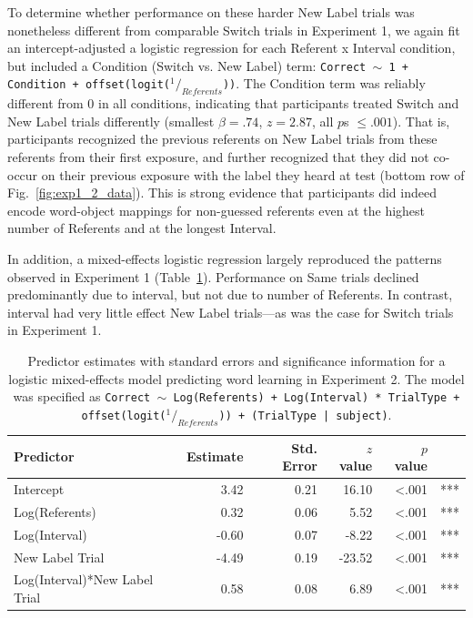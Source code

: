 \documentclass[man,floatsintext]{apa6}
\begin{document}
To determine whether performance on these harder New Label trials was nonetheless different from comparable Switch trials in Experiment 1, we again fit an intercept-adjusted a logistic regression for each Referent x Interval condition, but included a Condition (Switch vs. New Label) term: {\small \tt{Correct $\sim$ 1 + Condition + offset(logit($^1/_{Referents}$))}}. The Condition term was reliably different from 0 in all conditions, indicating that participants treated Switch and New Label trials differently (smallest $\beta =  .74$, $z=2.87$, all $p$s $\leq .001$). That is, participants recognized the previous referents on New Label trials from these referents from their first exposure, and further recognized that they did not co-occur on their previous exposure with the label they heard at test (bottom row of Fig.~\ref{fig:exp1_2_data}). This is strong evidence that participants did indeed encode word-object mappings for non-guessed referents even at the highest number of Referents and at the longest Interval.

In addition, a mixed-effects logistic regression largely reproduced the patterns observed in Experiment 1 (Table~\ref{tab:exp2_reg}). Performance on Same trials declined predominantly due to interval, but not due to number of Referents. In contrast, interval had very little effect New Label trials---as was the case for Switch trials in Experiment 1.

\begin{table}[tb]
\begin{center}
\begin{tabular}{lrrrrl}
 Predictor & Estimate & Std. Error & $z$ value & $p$ value &  \\ 
  \hline
  Intercept & 3.42 & 0.21 & 16.10 & <.001 & *** \\ 
  Log(Referents) & 0.32 & 0.06 & 5.52 & <.001 & *** \\ 
  Log(Interval) & -0.60 & 0.07 & -8.22 & <.001 & *** \\ 
  New Label Trial & -4.49 & 0.19 & -23.52 & <.001 & *** \\ 
  Log(Interval)*New Label Trial & 0.58 & 0.08 & 6.89 & <.001 & *** \\ 
   \hline
\end{tabular}
\end{center}
\caption{\label{tab:exp2_reg}Predictor estimates with standard errors and significance information for a logistic mixed-effects model predicting word learning in Experiment 2. The model was specified as {\small \tt{Correct $\sim$ Log(Referents) + Log(Interval) * TrialType + offset(logit($^1/_{Referents}$)) + (TrialType | subject)}}.}
\end{table}
\end{document}
